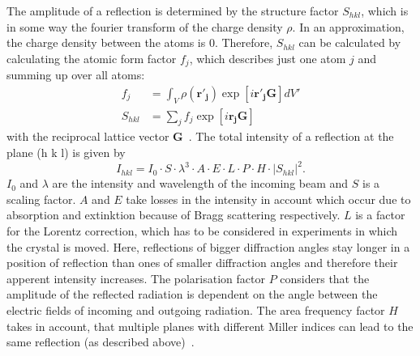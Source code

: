 The amplitude of a reflection is determined by the structure factor $S_{hkl}$, which is in some way the fourier transform of the charge density $\rho$. In an approximation, the charge density between the atoms is 0. Therefore, $S_{hkl}$ can be calculated by calculating the atomic form factor $f_j$, which describes just one atom $j$ and summing up over all atoms:
\begin{align}
    f_j &= \int_V \rho(\mathbf{r'_j}) \exp[i\mathbf{r'_jG}] dV' \\
    S_{hkl} &= \sum_{j} f_j \exp[i\mathbf{r_jG}]
\end{align}
with the reciprocal lattice vector $\mathbf{G}$~\cite{Bohm.2021}. The total intensity of a reflection at the plane (h k l) is given by
\begin{equation}
    I_{hkl} = I_0 \cdot S \cdot \lambda^3 \cdot A \cdot E \cdot L \cdot P \cdot H \cdot |S_{hkl}|^2.
\end{equation}
$I_0$ and $\lambda$ are the intensity and wavelength of the incoming beam and $S$ is a scaling factor. $A$ and $E$ take losses in the intensity in account which occur due to absorption and extinktion because of Bragg scattering respectively.  $L$ is a factor for the Lorentz correction, which has to be considered in experiments in which the crystal is moved. Here, reflections of bigger diffraction angles stay longer in a position of reflection than ones of smaller diffraction angles and therefore their apperent intensity increases. The polarisation factor $P$ considers that the amplitude of the reflected radiation is dependent on the angle between the electric fields of incoming and outgoing radiation. The area frequency factor $H$ takes in account, that multiple planes with different Miller indices can lead to the same reflection (as described above)~\cite{Bohm.2021}. \par 
 